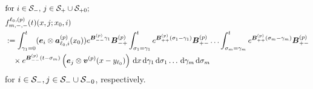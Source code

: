 \begin{align}
	\intertext{for \( i\in\mathcal S_-  ,\, j\in\mathcal S_{+}\cup\mathcal{S}_{+0};\)}
	&f^{\ell_0,(p)}_{m,-,-}(t)( x, j; x_0, i) \nonumber
	\\&:=\int_{\gamma_1=0}^t (\boldsymbol e_i\otimes \boldsymbol  a_{\ell_0,i}^{(p)}(x_0)) e^{\boldsymbol{B}^{(p)}_{--}\gamma_1}\boldsymbol{B}^{(p)}_{-+}	\nonumber
	\int_{\sigma_1=\gamma_1}^{t} e^{\boldsymbol{B}^{(p)}_{++}(\sigma_1-\gamma_1)}\boldsymbol{B}^{(p)}_{+-}
	\hdots 
	 \int_{\sigma_m=\gamma_{m}}^{t} e^{\boldsymbol{B}^{(p)}_{++}(\sigma_m-\gamma_{m})}\boldsymbol{B}^{(p)}_{+-}\\&\quad\times
	e^{\boldsymbol{B}^{(p)}_{--}(t-\sigma_m)}\left(\boldsymbol e_j  \otimes {\boldsymbol v}^{(p)}(x-y_{\ell_0})\right)\, \mathrm{d} x
	\, \mathrm{d} \gamma_1\, \mathrm{d} \sigma_1\dots \, \mathrm{d} \gamma_m\, \mathrm{d} \sigma_m\label{eqn: 67}
\end{align}
for \( i\in\mathcal{S}_-,j\in\mathcal S_-\cup\mathcal{S}_{-0}\), respectively. %


